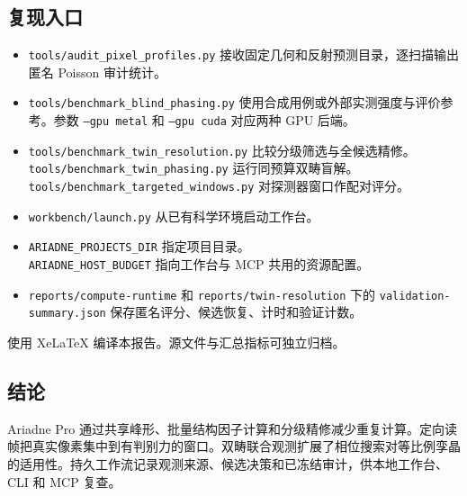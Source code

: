 \documentclass[11pt,a4paper,fontset=fandol,UTF8]{ctexart}
\newcommand{\code}[1]{\texttt{\small #1}}
\begin{document}
\subsection*{复现入口}
\begin{itemize}
  \item \code{tools/audit\_pixel\_profiles.py} 接收固定几何和反射预测目录，逐扫描输出匿名 Poisson 审计统计。
  \item \code{tools/benchmark\_blind\_phasing.py} 使用合成用例或外部实测强度与评价参考。参数 \code{--gpu metal} 和 \code{--gpu cuda} 对应两种 GPU 后端。
  \item \code{tools/benchmark\_twin\_resolution.py} 比较分级筛选与全候选精修。\\
        \code{tools/benchmark\_twin\_phasing.py} 运行同预算双畴盲解。\\
        \code{tools/benchmark\_targeted\_windows.py} 对探测器窗口作配对评分。
  \item \code{workbench/launch.py} 从已有科学环境启动工作台。
  \item \code{ARIADNE\_PROJECTS\_DIR} 指定项目目录。\\
        \code{ARIADNE\_HOST\_BUDGET} 指向工作台与 MCP 共用的资源配置。
  \item \code{reports/compute-runtime} 和 \code{reports/twin-resolution} 下的 \code{validation-summary.json} 保存匿名评分、候选恢复、计时和验证计数。
\end{itemize}
\noindent 使用 XeLaTeX 编译本报告。源文件与汇总指标可独立归档。

\subsection*{结论}
Ariadne Pro 通过共享峰形、批量结构因子计算和分级精修减少重复计算。定向读帧把真实像素集中到有判别力的窗口。双畴联合观测扩展了相位搜索对等比例孪晶的适用性。持久工作流记录观测来源、候选决策和已冻结审计，供本地工作台、CLI 和 MCP 复查。
\end{document}
